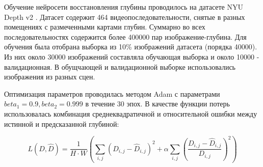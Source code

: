 \documentclass{mipt-thesis-ms}
\begin{document}
	Обучение нейросети восстановления глубины проводилось на датасете NYU Depth v2 \cite{silberman2012indoor}. Датасет содержит 464 видеопоследовательности, снятые в разных помещениях с размеченными картами глубин. Суммарно во всех последовательностях содержится более 400000 пар изображение-глубина. Для обучения была отобрана выборка из 10\% изображений датасета (порядка 40000). Из них около 30000 изображений составляла обучающая выборка и около 10000 - валидационная. В обущчающей и валидационной выборке использовались изображения из разных сцен.
	
	Оптимизация параметров проводилась методом Adam \cite{kingma2014adam} с параметрами $beta_1 = 0.9, beta_2 = 0.999$ в течение 30 эпох. В качестве функции потерь использовалась комбинация среднеквадратичной и относительной ошибки между истинной и предсказанной глубиной:
	
	\begin{equation}
		L(D, \widehat{D}) = \frac{1}{H \cdot W} (\sum\limits_{i,j} (D_{i,j} - \widehat{D}_{i,j})^2 + \alpha \sum\limits_{i,j} (\frac{D_{i,j} - \widehat{D}_{i,j}}{D_{i,j}})^2)
	\end{equation}
	
	\begin{table}[h]
		\caption{Оценка качества восстановления глубины и сравнительный анализ различных нейросетей}
		\label{table_nyu_results}
		\begin{center}
		\end{center}
	\end{table}
	
\end{document}
